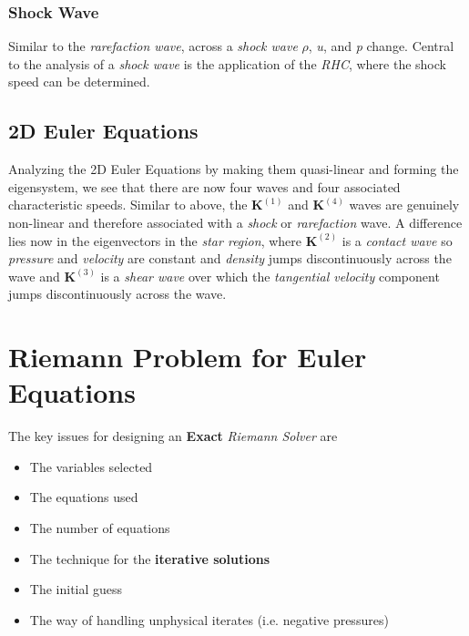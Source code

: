 \documentclass[]{article}
\begin{document}
		\subsubsection{Shock Wave}
			Similar to the \textit{rarefaction wave}, across a \textit{shock wave} $ \rho $, \textit{u}, and \textit{p} change. Central to the analysis of a \textit{shock wave} is the application of the \textit{RHC}, where the shock speed can be determined. 
			
		\subsection{2D Euler Equations}
			Analyzing the 2D Euler Equations by making them quasi-linear and forming the eigensystem, we see that there are now four waves and four associated characteristic speeds. Similar to above, the $ \textbf{K}^{(1)} $ and $ \textbf{K}^{(4)} $ waves are genuinely non-linear and therefore associated with a \textit{shock} or \textit{rarefaction} wave. A difference lies now in the eigenvectors in the \textit{star region}, where $ \textbf{K}^{(2)} $ is a \textit{contact wave} so \textit{pressure} and \textit{velocity} are constant and \textit{density} jumps discontinuously across the wave and $ \textbf{K}^{(3)} $ is a \textit{shear wave} over which the \textit{tangential velocity} component jumps discontinuously across the wave.	
		
\section{Riemann Problem for Euler Equations}
	The key issues for designing an \textbf{Exact} \textit{Riemann Solver} are \begin{itemize}
		\item The variables selected
		\item The equations used
		\item The number of equations
		\item The technique for the \textbf{iterative solutions}
		\item The initial guess
		\item The way of handling unphysical iterates (i.e. negative pressures)
	\end{itemize}
		
\end{document}
